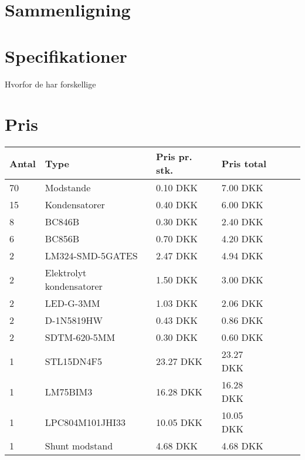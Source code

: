 \section{Sammenligning}\label{afs:sammenligning}

\section{Specifikationer}
Hvorfor de har forskellige

\section{Pris}

\begin{table}[h!]
	\small
	\centering
	\label{tab:pris_ic}
	\begin{threeparttable}
		\begin{tabular}{ l l l l l l l }
			\toprule
			\multicolumn{1}{l}{\textbf{Antal}}          &
			\multicolumn{1}{l}{\textbf{Type}}           &
			\multicolumn{1}{l}{\textbf{Pris pr. stk.}}  &
			\multicolumn{1}{l}{\textbf{Pris total}}   \\ 
			\hline
			70 &  Modstande                 &  0.10 DKK   &  7.00 DKK  \\
			15 &  Kondensatorer             &  0.40 DKK   &  6.00 DKK  \\
		    8  &  BC846B                    &  0.30 DKK   &  2.40 DKK  \\
		    6  &  BC856B                    &  0.70 DKK   &  4.20 DKK  \\
		    2  &  LM324-SMD-5GATES          &  2.47 DKK   &  4.94 DKK  \\ 
			2  &  Elektrolyt kondensatorer  &  1.50 DKK   &  3.00 DKK  \\
			2  &  LED-G-3MM                 &  1.03 DKK   &  2.06 DKK  \\
	 	    2  &  D-1N5819HW                &  0.43 DKK   &  0.86 DKK  \\
	 	    2  &  SDTM-620-5MM              &  0.30 DKK   &  0.60 DKK  \\ 
		    1  &  STL15DN4F5                & 23.27 DKK   & 23.27 DKK  \\
		    1  &  LM75BIM3                  & 16.28 DKK   & 16.28 DKK  \\
		   	1  &  LPC804M101JHI33           & 10.05 DKK   & 10.05 DKK  \\
		   	1  &  Shunt modstand            &  4.68 DKK   &  4.68 DKK  \\

\end{tabular}
\end{threeparttable}
\end{table}
